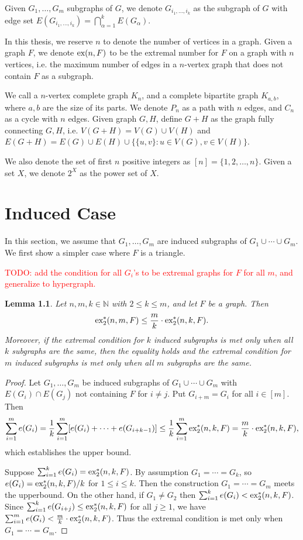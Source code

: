 \documentclass[12pt]{report}
\newtheorem{lemma}[theorem]{Lemma}
\newcommand*{\N}{\mathbb{N}}
\newcommand*{\ex}{\textnormal{ex}}
\newcommand*{\dexind}{\textnormal{ex}_2^*}
\begin{document}
Given $G_1, \ldots, G_m$ subgraphs of $G$, we denote $G_{i_1, \ldots, i_k}$ as the subgraph of $G$ with edge set $E(G_{i_1, \ldots, i_k}) = \bigcap_{\alpha = 1}^k E(G_{\alpha})$. 

In this thesis, we reserve $n$ to denote the number of vertices in a graph. Given a graph $F$, we denote $\ex(n, F)$ to be the extremal number for $F$ on a graph with $n$ vertices, i.e. the maximum number of edges in a $n$-vertex graph that does not contain $F$ as a subgraph. 

We call a $n$-vertex complete graph $K_n$, and a complete bipartite graph $K_{a, b}$, where $a, b$ are the size of its parts. We denote $P_n$ as a path with $n$ edges, and $C_n$ as a cycle with $n$ edges. Given graph $G, H$, define $G + H$ as the graph fully connecting $G, H$, i.e. $V(G + H) = V(G) \cup V(H)$ and $E(G + H) = E(G) \cup E(H) \cup \{\{u, v\} : u \in V(G), v \in V(H)\}$.

We also denote the set of first $n$ positive integers as $[n] = \{1, 2, \ldots, n\}$. Given a set $X$, we denote $2^X$ as the power set of $X$.

\chapter{Induced Case}

In this section, we assume that $G_1, \ldots, G_m$ are induced subgraphs of $G_1 \cup \cdots \cup G_m$. We first show a simpler case where $F$ is a triangle.

\textcolor{red}{TODO: add the condition for all $G_i$'s to be extremal graphs for $F$ for all $m$, and generalize to hypergraph.}

\begin{lemma}
  Let $n, m, k \in \N$ with $2 \leq k \leq m$, and let $F$ be a graph. Then
  \[
    \dexind(n, m, F) \leq \frac{m}{k} \cdot \dexind(n, k, F).
  \]
  Moreover, if the extremal condition for $k$ induced subgraphs is met only when all $k$ subgraphs are the same, then the equality holds and the extremal condition for $m$ induced subgraphs is met only when all $m$ subgraphs are the same.
\end{lemma}

\begin{proof}
  Let $G_1, \ldots, G_m$ be induced subgraphs of $G_1 \cup \cdots \cup G_m$ with $E(G_i) \cap E(G_j)$ not containing $F$ for $i \neq j$. Put $G_{i + m} = G_i$ for all $i \in [m]$. Then
  \[
    \sum_{i = 1}^m e(G_i) = \frac{1}{k}\sum_{i = 1}^m [e(G_i) + \cdots + e(G_{i + k - 1})] \leq \frac{1}{k}\sum_{i = 1}^m \dexind(n, k, F) = \frac{m}{k} \cdot \dexind(n, k, F),
  \]
  which establishes the upper bound.

  Suppose $\sum_{i = 1}^k e(G_i) = \dexind(n, k, F)$. By assumption $G_1 = \cdots = G_k$, so $e(G_i) = \dexind(n, k, F)/k$ for $1 \leq i \leq k$. Then the construction $G_1 = \cdots = G_m$ meets the upperbound. On the other hand, if $G_1 \neq G_2$ then $\sum_{i = 1}^k e(G_i) < \dexind(n, k, F)$. Since $\sum_{i = 1}^k e(G_{i + j}) \leq \dexind(n, k, F)$ for all $j \geq 1$, we have $\sum_{i = 1}^m e(G_i) < \frac{m}{k} \cdot \dexind(n, k, F)$. Thus the extremal condition is met only when $G_1 = \cdots = G_m$.
\end{proof}
\end{document}
